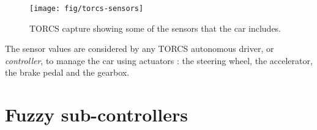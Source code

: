 \documentclass[10pt,journal,compsoc]{IEEEtran}
\begin{document}
\begin{figure}[!ht] 
	\begin{center}
		\texttt{[image: fig/torcs-sensors]}
		\caption {TORCS capture showing some of the sensors that the car includes.}
		\label{fig:torcs-sensors}
	\end{center}
\end{figure}


The sensor values are considered by any TORCS autonomous driver, or
{\em controller}, to manage the car using actuators \cite{manualTORCS}: the
steering wheel, the accelerator, the brake pedal and the gearbox.   



\section{Fuzzy sub-controllers}
\label{sec:subcontrollers}




\end{document}

